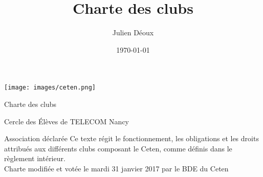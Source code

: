 \documentclass{article}
\title{Charte des clubs}
\author{Julien Déoux}
\date\today
\begin{document}
	
	\begin{titlepage}
		\begin{center}
			\texttt{[image: images/ceten.png]}\par
			\vspace{3cm}
			{\Huge \light{} Charte des clubs}\par
			\vfill
			{\large Cercle des Élèves de TELECOM Nancy}\par
			{\large\light{} Association déclarée}
			\vfill
			{\light{} Ce texte régit le fonctionnement, les obligations et les
			droits attribués aux différents clubs composant le Ceten, comme
			définis dans le règlement intérieur.\\
			Charte modifiée et votée le mardi 31 janvier 2017 par le BDE du
			Ceten}
		\end{center}
	\end{titlepage}


\end{document}
